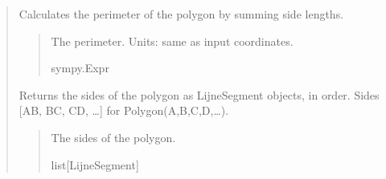 \documentclass[letterpaper,10pt,english]{sphinxmanual}
\begin{document}
\begin{quote}
\begin{fulllineitems}

\begin{fulllineitems}
\label{\detokenize{pygeox:pygeox.custom_objects.Polygon.perimeter}}
\pysigstartsignatures
\pysigline
{}
\pysigstopsignatures
\sphinxAtStartPar
Calculates the perimeter of the polygon by summing side lengths.
\begin{quote}\begin{description}
\sphinxAtStartPar
The perimeter. Units: same as input coordinates.

\sphinxAtStartPar
sympy.Expr

\end{description}\end{quote}

\end{fulllineitems}


\begin{fulllineitems}
\label{\detokenize{pygeox:pygeox.custom_objects.Polygon.sides}}
\pysigstartsignatures
\pysigline
{}
\pysigstopsignatures
\sphinxAtStartPar
Returns the sides of the polygon as LijneSegment objects, in order. Sides {[}AB, BC, CD, …{]} for Polygon(A,B,C,D,…).
\begin{quote}\begin{description}
\sphinxAtStartPar
The sides of the polygon.

\sphinxAtStartPar
list{[}LijneSegment{]}

\end{description}\end{quote}

\end{fulllineitems}


\end{fulllineitems}



\end{quote}
\end{document}
